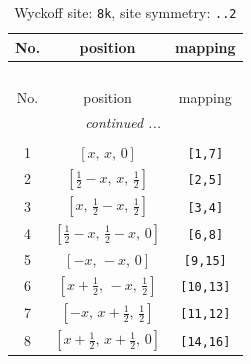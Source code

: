 \documentclass[fleqn,8pt]{jsarticle}
\begin{document}
\begin{longtable}{ccc}
\caption{Wyckoff site: {\tt 8k}, site symmetry: {\tt ..2}}
 \\
 \hline \hline
No. & position & mapping \\ \hline \endfirsthead

\multicolumn{2}{l}{\tablename\ \thetable{}} \\
 \hline \hline
No. & position & mapping \\ \hline \endhead

 \hline \hline
\multicolumn{2}{r}{\footnotesize\it continued ...} \\ \endfoot

 \hline \hline
\multicolumn{2}{r}{} \\ \endlastfoot

1 & $\left[ x,\, x,\, 0 \right]$ & {\tt [1,7]} \\ \hline
2 & $\left[ \frac{1}{2} - x,\, x,\, \frac{1}{2} \right]$ & {\tt [2,5]} \\ \hline
3 & $\left[ x,\, \frac{1}{2} - x,\, \frac{1}{2} \right]$ & {\tt [3,4]} \\ \hline
4 & $\left[ \frac{1}{2} - x,\, \frac{1}{2} - x,\, 0 \right]$ & {\tt [6,8]} \\ \hline
5 & $\left[ - x,\, - x,\, 0 \right]$ & {\tt [9,15]} \\ \hline
6 & $\left[ x + \frac{1}{2},\, - x,\, \frac{1}{2} \right]$ & {\tt [10,13]} \\ \hline
7 & $\left[ - x,\, x + \frac{1}{2},\, \frac{1}{2} \right]$ & {\tt [11,12]} \\ \hline
8 & $\left[ x + \frac{1}{2},\, x + \frac{1}{2},\, 0 \right]$ & {\tt [14,16]} \\
\end{longtable}
\renewcommand{\arraystretch}{1.2}
\end{document}
